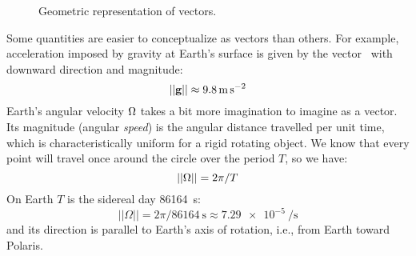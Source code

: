 \begin{figure}
\begin{center}
  	\end{center}
	\caption{Geometric representation of vectors.}
	\label{vectors}
	\end{figure}
Some quantities are easier to conceptualize as vectors than others. For example, acceleration imposed by gravity at Earth's surface is given by the vector \vg\ with downward direction and magnitude: 
\begin{equation}
||\vg||\approx\qty{9.8}{\m\per\second\squared}\label{g}
\end{equation}
Earth's angular velocity $\Omega$ takes a bit more imagination to imagine as a vector. Its magnitude (angular \emph{speed}) is the angular distance travelled per unit time, which is characteristically uniform for a rigid rotating object. We know that every point will travel once around the circle over the period $T$, so we have:
\begin{equation}
||\Omega||=2\pi/T
\end{equation}
On Earth $T$ is the sidereal day \qty{86164}{\second}:
\begin{equation}
||\Omega||=2\pi/\qty{86164}{\second}\approx\qty{7.29e-5}{\per\second}\label{omega}
\end{equation}
and its direction is parallel to Earth's axis of rotation, i.e., from Earth toward Polaris.

